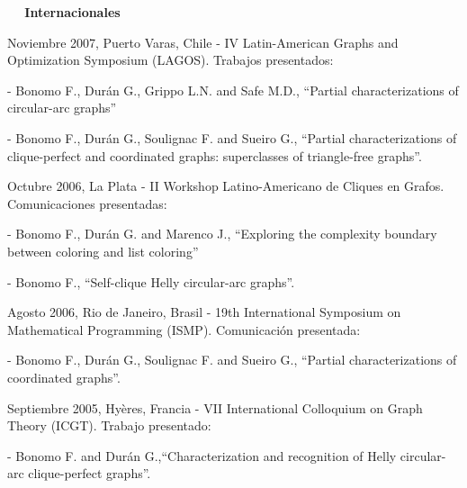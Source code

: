 
\textbf{$\quad$ Internacionales}

\smallskip

\begin{compactitem}
\item Noviembre 2007, Puerto Varas, Chile - IV Latin-American
Graphs and Optimization Symposium (LAGOS). Trabajos presentados:
\begin{compactitem}
\item[-] Bonomo F., Dur\'an G., Grippo L.N. and Safe M.D.,
``Partial characterizations of circular-arc graphs'' \item[-]
Bonomo F., Dur\'an G., Soulignac F. and Sueiro G., ``Partial
characterizations of clique-perfect and coordinated graphs:
superclasses of triangle-free graphs''.
\end{compactitem}

\smallskip

\item Octubre 2006, La Plata - II Workshop Latino-Americano de
Cliques en Grafos. Comunicaciones presentadas:
\begin{compactitem}
\item[-] Bonomo F., Dur\'an G. and Marenco J., ``Exploring the
complexity boundary between coloring and list coloring'' \item[-]
Bonomo F., ``Self-clique Helly circular-arc graphs''.
\end{compactitem}

\smallskip

\item Agosto 2006, Rio de Janeiro, Brasil - 19th International
Symposium on Mathematical Programming (ISMP). Comunicaci\'on
presentada:
\begin{compactitem}
\item[-] Bonomo F., Dur\'an G., Soulignac F. and Sueiro G.,
``Partial characterizations of coordinated graphs''.
\end{compactitem}

\smallskip

\item Septiembre 2005, Hy\`eres, Francia - VII International
Colloquium on Graph Theory (ICGT). Trabajo presentado:
\begin{compactitem}
\item[-] Bonomo F. and Dur\'an G.,``Characterization and
recognition of Helly circular-arc clique-perfect graphs''.
\end{compactitem}

\smallskip


\end{compactitem}
